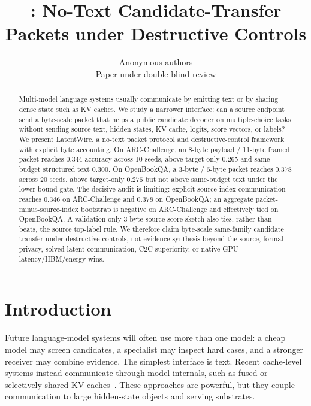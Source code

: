 \documentclass{article}
\title{\method: No-Text Candidate-Transfer Packets under Destructive Controls}
\author{Anonymous authors\\Paper under double-blind review}
\newcommand{\method}{LatentWire}
\newcommand{\arc}{ARC-Challenge}
\newcommand{\obqa}{OpenBookQA}
\begin{document}
\ifcolmsubmission
\linenumbers
\fi

\maketitle

\begin{abstract}
Multi-model language systems usually communicate by emitting text or by sharing dense state such as KV caches. We study a narrower interface: can a source endpoint send a byte-scale packet that helps a public candidate decoder on multiple-choice tasks without sending source text, hidden states, KV cache, logits, score vectors, or labels? We present \method, a no-text packet protocol and destructive-control framework with explicit byte accounting. On \arc{}, an 8-byte payload / 11-byte framed packet reaches 0.344 accuracy across 10 seeds, above target-only 0.265 and same-budget structured text 0.300. On \obqa{}, a 3-byte / 6-byte packet reaches 0.378 across 20 seeds, above target-only 0.276 but not above same-budget text under the lower-bound gate. The decisive audit is limiting: explicit source-index communication reaches 0.346 on \arc{} and 0.378 on \obqa{}; an aggregate packet-minus-source-index bootstrap is negative on \arc{} and effectively tied on \obqa{}. A validation-only 3-byte source-score sketch also ties, rather than beats, the source top-label rule. We therefore claim byte-scale same-family candidate transfer under destructive controls, not evidence synthesis beyond the source, formal privacy, solved latent communication, C2C superiority, or native GPU latency/HBM/energy wins.
\end{abstract}

\section{Introduction}

Future language-model systems will often use more than one model: a cheap model may screen candidates, a specialist may inspect hard cases, and a stronger receiver may combine evidence. The simplest interface is text. Recent cache-level systems instead communicate through model internals, such as fused or selectively shared KV caches~\citep{Fu2025C2C,Shi2025KVComm,Ye2025KVCOMM}. These approaches are powerful, but they couple communication to large hidden-state objects and serving substrates.
\end{document}
